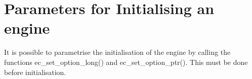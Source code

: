 %
% 
% 
% 
% 

\chapter{Parameters for Initialising an {\eclipse} engine}

\label{chapecoptions}
It is possible to parametrise the initialisation of the \eclipse
engine by calling the functions ec_set_option_long() and ec_set_option_ptr().
This must be done before initialisation.

